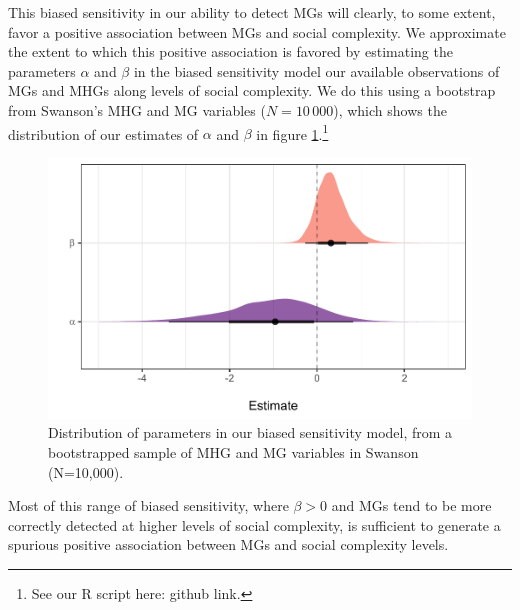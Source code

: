 \documentclass[
]{article}
\begin{document}
This biased sensitivity in our ability to detect MGs will clearly, to some extent, favor a positive association between MGs and social complexity. We approximate the extent to which this positive association is favored by estimating the parameters \(\alpha\) and \(\beta\) in the biased sensitivity model our available observations of MGs and MHGs along levels of social complexity. We do this using a bootstrap from Swanson's MHG and MG variables (\(N=10\,000\)), which shows the distribution of our estimates of \(\alpha\) and \(\beta\) in figure \ref{fig:swansonParameters}.\footnote{See our R script here: github link.}

\begin{figure}
\centering
\includegraphics{mhg-writeup_files/figure-latex/swansonParameters-1.pdf}
\caption{\label{fig:swansonParameters}Distribution of parameters in our biased sensitivity model, from a bootstrapped sample of MHG and MG variables in Swanson (N=10,000).}
\end{figure}

Most of this range of biased sensitivity, where \(\beta>0\) and MGs tend to be more correctly detected at higher levels of social complexity, is sufficient to generate a spurious positive association between MGs and social complexity levels.
\end{document}
